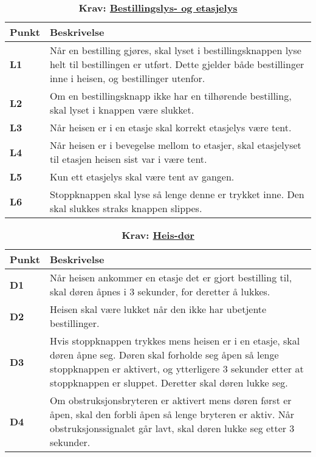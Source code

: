 \begin{table}[H]
    \centering
    \caption*{\textbf{\textcolor{NTNU_blue}{Krav}: \underline{Bestillingslys- og etasjelys}}}
    \begin{tabular}{@{}  |p{1.25cm}| p{12.25cm}|  @{}}
    \hline
     \textbf{Punkt}             & \textbf{Beskrivelse} \\
    \hline
    \textbf{\textcolor{NTNU_blue}{L1}} & Når en bestilling gjøres, skal lyset i bestillingsknappen lyse helt til bestillingen er utført. Dette gjelder både bestillinger inne i heisen, og bestillinger utenfor.\\\cline{1-2} 
    \textbf{\textcolor{NTNU_blue}{L2}} & Om en bestillingsknapp ikke har en tilhørende bestilling, skal lyset i knappen være slukket.\\\cline{1-2} 
    \textbf{\textcolor{NTNU_blue}{L3}} & Når heisen er i en etasje skal korrekt etasjelys være tent.\\\cline{1-2} 
    \textbf{\textcolor{NTNU_blue}{L4}} & Når heisen er i bevegelse mellom to etasjer, skal etasjelyset til etasjen heisen sist var i være tent.\\\cline{1-2} 
    \textbf{\textcolor{NTNU_blue}{L5}} & Kun ett etasjelys skal være tent av gangen.\\\cline{1-2} 
    \textbf{\textcolor{NTNU_blue}{L6}} & Stoppknappen skal lyse så lenge denne er trykket inne. Den skal slukkes straks knappen slippes.\\\cline{1-2} 
    \end{tabular}
\end{table}


\begin{table}[H]
    \centering
    \caption*{\textbf{\textcolor{NTNU_blue}{Krav}: \underline{Heis-dør}}}
    \begin{tabular}{@{}  |p{1.25cm}| p{12.25cm}|  @{}}
    \hline
      \textbf{Punkt}             & \textbf{Beskrivelse} \\
    \hline
    \textbf{\textcolor{NTNU_blue}{D1}} & Når heisen ankommer en etasje det er gjort bestilling til, skal døren åpnes i 3 sekunder, for deretter å lukkes.\\\cline{1-2} 
    \textbf{\textcolor{NTNU_blue}{D2}} & Heisen skal være lukket når den ikke har ubetjente bestillinger.\\\cline{1-2} 
    \textbf{\textcolor{NTNU_blue}{D3}} & Hvis stoppknappen trykkes mens heisen er i en etasje, skal døren åpne seg. Døren skal forholde seg åpen så lenge stoppknappen er aktivert, og ytterligere 3 sekunder etter at stoppknappen er sluppet. Deretter skal døren lukke seg.\\\cline{1-2} 
    \textbf{\textcolor{NTNU_blue}{D4}} & Om obstruksjonsbryteren er aktivert mens døren først er åpen, skal den forbli åpen så lenge bryteren er aktiv. Når obstruksjonssignalet går lavt, skal døren lukke seg etter 3 sekunder.\\\cline{1-2} 
    \end{tabular}
\end{table}



